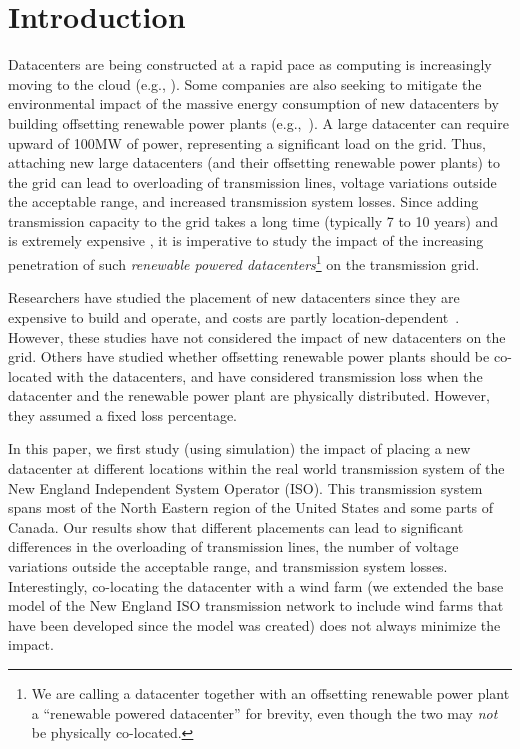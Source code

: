 \section{Introduction}
\label{sec:intro}

Datacenters are being constructed at a rapid pace as computing is increasingly moving to the cloud (e.g., \cite{RM14DCGrowth}).  Some companies are also seeking to mitigate the environmental impact of the massive energy consumption of new datacenters by building offsetting renewable power plants (e.g.,~\cite{GoogleGreen,Apple13,McGrawHill11}).  A large datacenter can require upward of 100MW of power, representing a significant load on the grid.  Thus, attaching new large datacenters (and their offsetting renewable power plants) to the grid can lead to overloading of transmission lines, voltage variations outside the acceptable range, and increased transmission system losses.
Since adding transmission capacity to the grid takes a long time (typically 7 to 10 years) and is extremely expensive \cite{interconnection2010survey}, it is imperative to study the impact of
the increasing penetration of such
{\em renewable powered datacenters}\footnote{We are calling a datacenter together with an offsetting renewable power plant a ``renewable powered datacenter'' for brevity, even though the two may {\em not} be physically co-located.}
on the transmission grid.

Researchers have studied the placement of new datacenters since they are expensive to build and operate, and costs are partly location-dependent~\cite{Goiri11place,Dalger05,Boley09,larumbe2012optimal,berral2014building}.  However, these studies have not considered the impact of new datacenters on the grid.  Others have studied whether offsetting renewable power plants should be co-located with the datacenters\cite{Ren12MASCOTS}, and have considered transmission loss when the datacenter and the renewable power plant are physically distributed.  However, they assumed a fixed loss percentage.

In this paper, we first study (using simulation) the impact of placing
a new datacenter at different locations within the real world
transmission system of the New England Independent System Operator
(ISO).  This transmission system spans most of the North Eastern
region of the United States and some parts of Canada.  Our results
show that different placements can lead to significant differences in
the overloading of transmission lines, the number of voltage
variations outside the acceptable range, and transmission system
losses.  Interestingly, co-locating the datacenter with a wind farm
(we extended the base model of the New England ISO transmission
network to include wind farms that have been developed since the model
was created) does not always minimize the impact.


